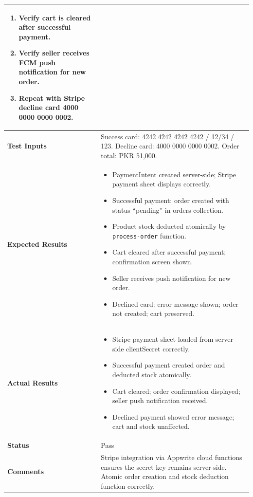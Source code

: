 {\begin{longtable}{|p{3.2cm}|p{10.8cm}|}
\begin{enumerate}[leftmargin=*,noitemsep]
\item Verify cart is cleared after successful payment.
\item Verify seller receives FCM push notification for new order.
\item Repeat with Stripe decline card 4000 0000 0000 0002.
\end{enumerate} \\ \hline
\textbf{Test Inputs} & Success card: 4242 4242 4242 4242 / 12/34 / 123. \newline Decline card: 4000 0000 0000 0002. \newline Order total: PKR 51,000. \\ \hline
\textbf{Expected Results} &
\begin{itemize}[leftmargin=*,noitemsep]
\item PaymentIntent created server-side; Stripe payment sheet displays correctly.
\item Successful payment: order created with status ``pending'' in orders collection.
\item Product stock deducted atomically by \texttt{process-order} function.
\item Cart cleared after successful payment; confirmation screen shown.
\item Seller receives push notification for new order.
\item Declined card: error message shown; order not created; cart preserved.
\end{itemize} \\ \hline
\textbf{Actual Results} &
\begin{itemize}[leftmargin=*,noitemsep]
\item Stripe payment sheet loaded from server-side clientSecret correctly.
\item Successful payment created order and deducted stock atomically.
\item Cart cleared; order confirmation displayed; seller push notification received.
\item Declined payment showed error message; cart and stock unaffected.
\end{itemize} \\ \hline
\textbf{Status} & Pass \\ \hline
\textbf{Comments} & Stripe integration via Appwrite cloud functions ensures the secret key remains server-side. Atomic order creation and stock deduction function correctly. \\ \hline
\end{longtable}
}

